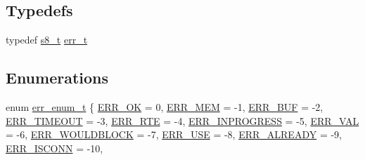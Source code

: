 \subsection*{Typedefs}
\begin{DoxyCompactItemize}
\item 
typedef \hyperlink{group__compiler__abstraction_ga9cd1d7891fe315de1201e2c6e45f4f57}{s8\+\_\+t} \hyperlink{group__infrastructure__errors_gaf02d9da80fd66b4f986d2c53d7231ddb}{err\+\_\+t}
\end{DoxyCompactItemize}
\subsection*{Enumerations}
\begin{DoxyCompactItemize}
\item 
enum \hyperlink{group__infrastructure__errors_gae2e66c7d13afc90ffecd6151680fbadc}{err\+\_\+enum\+\_\+t} \{ \newline
\hyperlink{group__infrastructure__errors_ggae2e66c7d13afc90ffecd6151680fbadcaa26c163b80b1f6786ca81dadc14b00fb}{E\+R\+R\+\_\+\+OK} = 0, 
\hyperlink{group__infrastructure__errors_ggae2e66c7d13afc90ffecd6151680fbadcaaaeafdbf3aecc46864daa3cd829c7e05}{E\+R\+R\+\_\+\+M\+EM} = -\/1, 
\hyperlink{group__infrastructure__errors_ggae2e66c7d13afc90ffecd6151680fbadca05c91366f1b5203a5db9a241b415cd63}{E\+R\+R\+\_\+\+B\+UF} = -\/2, 
\hyperlink{group__infrastructure__errors_ggae2e66c7d13afc90ffecd6151680fbadcac568baeb6407ef5e2630084ccbc34be8}{E\+R\+R\+\_\+\+T\+I\+M\+E\+O\+UT} = -\/3, 
\newline
\hyperlink{group__infrastructure__errors_ggae2e66c7d13afc90ffecd6151680fbadca9448893187313c0c5a502ca9a9ad1c2a}{E\+R\+R\+\_\+\+R\+TE} = -\/4, 
\hyperlink{group__infrastructure__errors_ggae2e66c7d13afc90ffecd6151680fbadca13e1dd0edca8a27b6abdf1524bde7929}{E\+R\+R\+\_\+\+I\+N\+P\+R\+O\+G\+R\+E\+SS} = -\/5, 
\hyperlink{group__infrastructure__errors_ggae2e66c7d13afc90ffecd6151680fbadcaa9a1c5a6fdeed0aad7fe41d538482bbd}{E\+R\+R\+\_\+\+V\+AL} = -\/6, 
\hyperlink{group__infrastructure__errors_ggae2e66c7d13afc90ffecd6151680fbadcab9dcf89d46668b072192278fb907b7ad}{E\+R\+R\+\_\+\+W\+O\+U\+L\+D\+B\+L\+O\+CK} = -\/7, 
\newline
\hyperlink{group__infrastructure__errors_ggae2e66c7d13afc90ffecd6151680fbadca4ebdc2aa1dbd75f927845733a3fb1f8b}{E\+R\+R\+\_\+\+U\+SE} = -\/8, 
\hyperlink{group__infrastructure__errors_ggae2e66c7d13afc90ffecd6151680fbadcae6f9c1e4c18ca844f7934307d4cc30e5}{E\+R\+R\+\_\+\+A\+L\+R\+E\+A\+DY} = -\/9, 
\hyperlink{group__infrastructure__errors_ggae2e66c7d13afc90ffecd6151680fbadca8543e1d6422fed7b318d97e08dcbaa33}{E\+R\+R\+\_\+\+I\+S\+C\+O\+NN} = -\/10, 

\end{DoxyCompactItemize}
